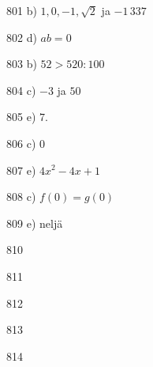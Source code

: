 \begin{Vastaus}{801}
	b) $1, 0, -1, \sqrt{2}$ ja $-1\,337$
	
\end{Vastaus}
\begin{Vastaus}{802}
d) $ab = 0$
	
\end{Vastaus}
\begin{Vastaus}{803}
b) $52 > 520:100$
	
\end{Vastaus}
\begin{Vastaus}{804}
c) $-3$ ja $50$ %
	
\end{Vastaus}
\begin{Vastaus}{805}
e) $7.$
	
\end{Vastaus}
\begin{Vastaus}{806}
c) $0$
	
\end{Vastaus}
\begin{Vastaus}{807}
e) $4x^2-4x+1$
	
\end{Vastaus}
\begin{Vastaus}{808}
	c) $f(0) = g(0)$
	
\end{Vastaus}
\begin{Vastaus}{809}
	e) neljä
	
\end{Vastaus}
\begin{Vastaus}{810}
	
\end{Vastaus}
\begin{Vastaus}{811}
	
\end{Vastaus}
\begin{Vastaus}{812}
    
\end{Vastaus}
\begin{Vastaus}{813}
    
\end{Vastaus}
\begin{Vastaus}{814}
    
\end{Vastaus}
